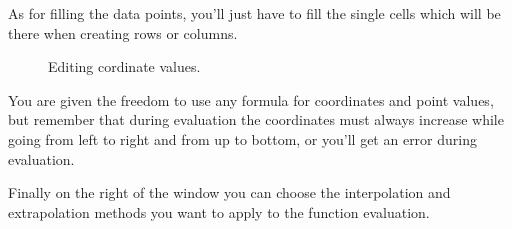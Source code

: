 As for filling the data points, you'll just have to fill the single cells which will be there when creating rows or columns.

\begin{figure}[h]
\begin{center}
\caption{Editing cordinate values.}
\label{fig.PFunction2DColumnEdit}
\end{center}
\end{figure}

You are given the freedom to use any formula for coordinates and point values, but remember that during evaluation the coordinates must always increase while going from left to right and from up to bottom, or you'll get an error during evaluation.

Finally on the right of the window you can choose the interpolation and extrapolation methods you want to apply to the function evaluation.



